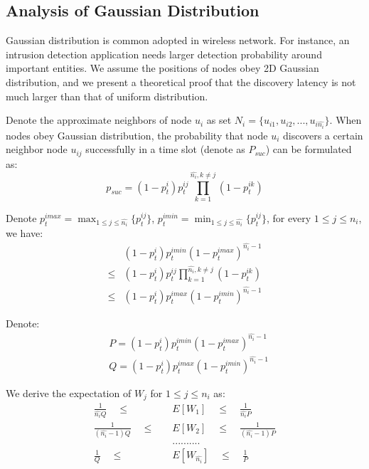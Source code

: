 










\subsection{Analysis of Gaussian Distribution}
\label{normal}
Gaussian distribution is common adopted in wireless network. For instance, an intrusion detection application needs larger detection
probability around important entities\cite{wang2013gaussian}. We assume the positions of nodes obey 2D Gaussian distribution, and we present a theoretical proof that the discovery latency is not much larger than that of uniform distribution. 

Denote the approximate neighbors of node $u_i$ as set $N_i = \{u_{i1},u_{i2},...,u_{i\hat{n_i}}\}$. When nodes obey Gaussian distribution, the probability that node $u_i$ discovers a certain neighbor node $u_{ij}$ successfully in a time slot (denote as $P_{suc}$) can be formulated as:
$$
p_{suc} = (1-p_t^i)p_t^{ij}\prod_{ k=1}^{\hat{n_i}, k\neq j}(1-p_t^{ik})
$$

Denote $p_t^{imax} = \max_{1 \leq j \leq \hat{n_i}}\{p_t^{ij}\}$, $p_t^{imin} = \min_{1 \leq j \leq \hat{n_i}}\{p_t^{ij}\}$, for every $1 \leq j \leq n_i$, we have:
\begin{align*}
&(1-p_t^i)p_t^{imin}{(1-p_t^{imax})}^{\hat{n_i}-1} \\
\leq &(1-p_t^i)p_t^{ij}\prod_{ k=1}^{\hat{n_i}, k\neq j}(1-p_t^{ik}) \\
\leq &(1-p_t^i)p_t^{imax}{(1-p_t^{imin})}^{\hat{n_i}-1}
\end{align*}

Denote:
\begin{align*}
&P = (1-p_t^i)p_t^{imin}{(1-p_t^{imax})}^{\hat{n_i}-1}  \\
&Q = (1-p_t^i)p_t^{imax}{(1-p_t^{imin})}^{\hat{n_i}-1}
\end{align*}

We derive the expectation of $W_j$ for $1 \leq j \leq n_i$ as:
\begin{align*}
\frac{1}{\hat{n_i}Q} \quad \leq \quad &E[W_1] \quad \leq \quad \frac{1}{\hat{n_i}P} \\
\frac{1}{(\hat{n_i}-1)Q} \quad \leq \quad &E[W_2] \quad \leq \quad \frac{1}{(\hat{n_i}-1)P} \\
& ..........\\
\frac{1}{Q} \quad \leq \quad &E[W_{\hat{n_i}}] \quad \leq \quad \frac{1}{P}
\end{align*}

